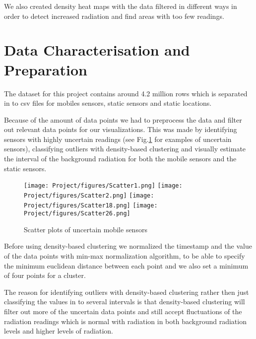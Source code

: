 \documentclass[journal]{vgtc}                %
\begin{document}
We also created density heat maps with the data filtered in different ways in order to detect increased radiation and find areas with too few readings.


\section{Data Characterisation and Preparation}

The dataset for this project contains around 4.2 million rows which is separated in to csv files for mobiles sensors, static sensors and static locations.

Because of the amount of data points we had to preprocess the data and filter out relevant data points for our visualizations. This was made by identifying sensors with highly uncertain readings (see Fig.\ref{fig:Scatterplots} for examples of uncertain sensors), classifying outliers with density-based clustering\cite{Density-basedClustering} and visually estimate the interval of the background radiation for both the mobile sensors and the static sensors.
\begin{figure}[h!]
    \centering
    \texttt{[image: Project/figures/Scatter1.png]}
    \texttt{[image: Project/figures/Scatter2.png]}
    \texttt{[image: Project/figures/Scatter18.png]}
    \texttt{[image: Project/figures/Scatter26.png]}
    \caption{Scatter plots of uncertain mobile sensors}
    \label{fig:Scatterplots}
\end{figure}


Before using density-based clustering we normalized the timestamp and the value of the data points with min-max normalization algorithm\cite{Min-Max}, to be able to specify the minimum euclidean distance between each point and we also set a minimum of four points for a cluster.

The reason for identifying outliers with density-based clustering rather then just classifying the values in to several intervals is that density-based clustering will filter out more of the uncertain data points and still accept fluctuations of the radiation readings which is normal with radiation in both background radiation levels and higher levels of radiation.
\end{document}

